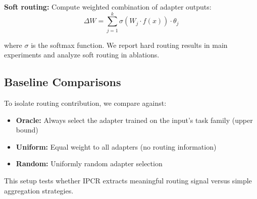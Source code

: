 \textbf{Soft routing:} Compute weighted combination of adapter outputs:
\begin{equation}
\Delta W = \sum_{j=1}^k \sigma(W_j \cdot f(x)) \cdot \theta_j
\end{equation}

where $\sigma$ is the softmax function. We report hard routing results in main experiments and analyze soft routing in ablations.

\subsection{Baseline Comparisons}

To isolate routing contribution, we compare against:
\begin{itemize}
    \item \textbf{Oracle:} Always select the adapter trained on the input's task family (upper bound)
    \item \textbf{Uniform:} Equal weight to all adapters (no routing information)
    \item \textbf{Random:} Uniformly random adapter selection
\end{itemize}

This setup tests whether IPCR extracts meaningful routing signal versus simple aggregation strategies.
